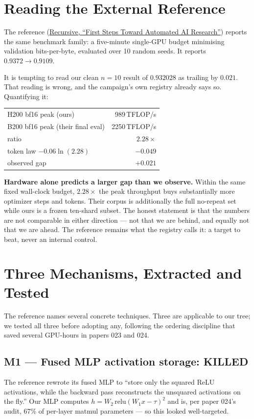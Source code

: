 \documentclass{article}
\begin{document}
\section{Reading the External Reference}
The reference (\href{https://www.recursive.com/articles/first-steps-toward-automated-ai-research}{Recursive, ``First Steps Toward Automated AI Research''}) reports the same benchmark family: a five-minute single-GPU budget minimising validation bits-per-byte, evaluated over 10 random seeds. It reports $0.9372 \to 0.9109$.

It is tempting to read our clean $n{=}10$ result of $0.932028$ as trailing by $0.021$. That reading is wrong, and the campaign's own registry already says so. Quantifying it:

\begin{center}\begin{small}
\begin{tabular}{lr}
\toprule
H200 bf16 peak (ours) & 989\,TFLOP/s \\
B200 bf16 peak (their final eval) & 2250\,TFLOP/s \\
ratio & $2.28\times$ \\
\midrule
token law $-0.06\ln(2.28)$ & $\mathbf{-0.049}$ \\
observed gap & $+0.021$ \\
\bottomrule
\end{tabular}
\end{small}\end{center}

\textbf{Hardware alone predicts a larger gap than we observe.} Within the same fixed wall-clock budget, $2.28\times$ the peak throughput buys substantially more optimizer steps and tokens. Their corpus is additionally the full no-repeat set while ours is a frozen ten-shard subset. The honest statement is that the numbers are not comparable in either direction --- not that we are behind, and equally not that we are ahead. The reference remains what the registry calls it: a target to beat, never an internal control.

\section{Three Mechanisms, Extracted and Tested}
The reference names several concrete techniques. Three are applicable to our tree; we tested all three before adopting any, following the ordering discipline that saved several GPU-hours in papers 023 and 024.

\subsection{M1 --- Fused MLP activation storage: KILLED}
The reference rewrote its fused MLP to ``store only the squared ReLU activations, while the backward pass reconstructs the unsquared activations on the fly.'' Our MLP computes $h = W_2\,\mathrm{relu}(W_1x-\tau)^2$ and is, per paper 024's audit, 67\% of per-layer matmul parameters --- so this looked well-targeted.
\end{document}
